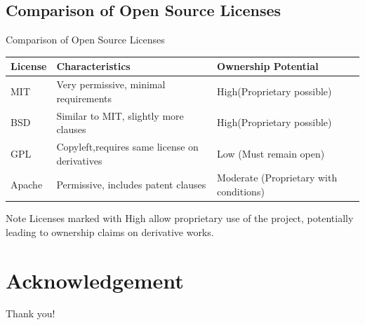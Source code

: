 \documentclass[10pt]{beamer}
\begin{document}
\subsection{Comparison of Open Source Licenses}
\begin{frame}{Comparison of Open Source Licenses}
  \footnotesize %
  \begin{table}[]
      \begin{tabular}{|l|l|l|}
      \hline
      \textbf{License} & \textbf{Characteristics} & \textbf{Ownership Potential} \\ \hline
      MIT              & Very permissive, minimal requirements & \alert{High(Proprietary possible)}  \\ \hline
      BSD              & Similar to MIT, slightly more clauses & \alert{High(Proprietary possible)}  \\ \hline
      GPL              & Copyleft,requires same license on derivatives & Low (Must remain open) \\ \hline
      Apache           & Permissive, includes patent clauses & Moderate (Proprietary with conditions) \\ \hline
      \end{tabular}
  \end{table}

  \begin{alertblock}{Note}
      Licenses marked with \alert{High} allow proprietary use of the project, potentially leading to ownership claims on derivative works.
  \end{alertblock}
\end{frame}

\section*{Acknowledgement}  
\begin{frame}
\textcolor{myNewColorA}{\Huge{\centerline{Thank you!}}}
\end{frame}
\end{document}
